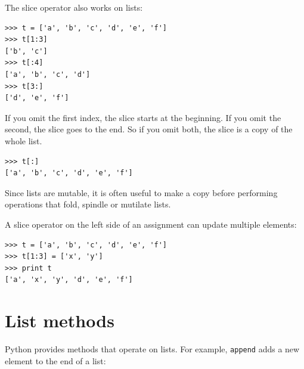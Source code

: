 \documentclass[10pt]{book}
\begin{document}
The slice operator also works on lists:

\begin{verbatim}
>>> t = ['a', 'b', 'c', 'd', 'e', 'f']
>>> t[1:3]
['b', 'c']
>>> t[:4]
['a', 'b', 'c', 'd']
>>> t[3:]
['d', 'e', 'f']
\end{verbatim}
%
If you omit the first index, the slice starts at the beginning.
If you omit the second, the slice goes to the end.  So if you
omit both, the slice is a copy of the whole list.

\begin{verbatim}
>>> t[:]
['a', 'b', 'c', 'd', 'e', 'f']
\end{verbatim}
%
Since lists are mutable, it is often useful to make a copy
before performing operations that fold, spindle or mutilate
lists.

A slice operator on the left side of an assignment
can update multiple elements:

\begin{verbatim}
>>> t = ['a', 'b', 'c', 'd', 'e', 'f']
>>> t[1:3] = ['x', 'y']
>>> print t
['a', 'x', 'y', 'd', 'e', 'f']
\end{verbatim}
%


%

%


\section{List methods}

Python provides methods that operate on lists.  For example,
{\tt append} adds a new element to the end of a list:
\end{document}
